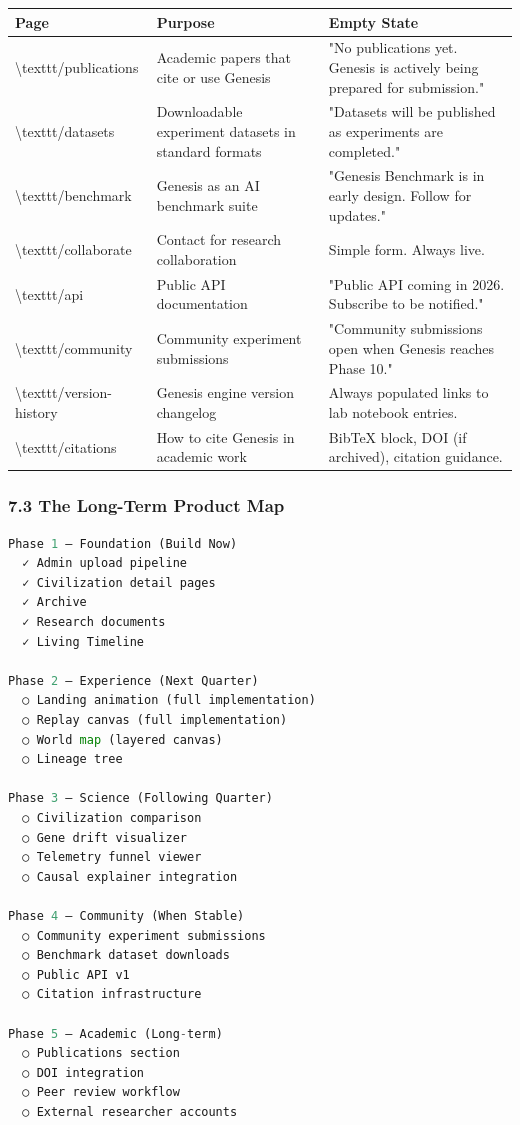 \documentclass[11pt,a4paper]{article}
\begin{document}
\begin{longtable}{lll}
\toprule
Page & Purpose & Empty State \\
\midrule
\endhead
\textbackslash{}texttt{/publications} & Academic papers that cite or use Genesis & "No publications yet. Genesis is actively being prepared for submission." \\
\textbackslash{}texttt{/datasets} & Downloadable experiment datasets in standard formats & "Datasets will be published as experiments are completed." \\
\textbackslash{}texttt{/benchmark} & Genesis as an AI benchmark suite & "Genesis Benchmark is in early design. Follow for updates." \\
\textbackslash{}texttt{/collaborate} & Contact for research collaboration & Simple form. Always live. \\
\textbackslash{}texttt{/api} & Public API documentation & "Public API coming in 2026. Subscribe to be notified." \\
\textbackslash{}texttt{/community} & Community experiment submissions & "Community submissions open when Genesis reaches Phase 10." \\
\textbackslash{}texttt{/version-history} & Genesis engine version changelog & Always populated  links to lab notebook entries. \\
\textbackslash{}texttt{/citations} & How to cite Genesis in academic work & BibTeX block, DOI (if archived), citation guidance. \\
\bottomrule
\end{longtable}

\subsubsection*{7.3 The Long-Term Product Map}

\begin{lstlisting}[language=Python]
Phase 1 — Foundation (Build Now)
  ✓ Admin upload pipeline
  ✓ Civilization detail pages
  ✓ Archive
  ✓ Research documents
  ✓ Living Timeline

Phase 2 — Experience (Next Quarter)
  ○ Landing animation (full implementation)
  ○ Replay canvas (full implementation)
  ○ World map (layered canvas)
  ○ Lineage tree

Phase 3 — Science (Following Quarter)
  ○ Civilization comparison
  ○ Gene drift visualizer
  ○ Telemetry funnel viewer
  ○ Causal explainer integration

Phase 4 — Community (When Stable)
  ○ Community experiment submissions
  ○ Benchmark dataset downloads
  ○ Public API v1
  ○ Citation infrastructure

Phase 5 — Academic (Long-term)
  ○ Publications section
  ○ DOI integration
  ○ Peer review workflow
  ○ External researcher accounts
\end{lstlisting}
\end{document}
